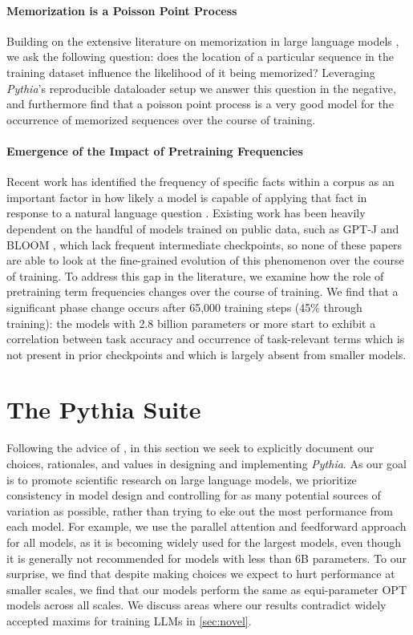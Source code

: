 \paragraph{Memorization is a Poisson Point Process} Building on the extensive literature on memorization in large language models \citep{carlini2019secret,carlini2021extracting,hu2022membership}, we ask the following question: does the location of a particular sequence in the training dataset influence the likelihood of it being memorized? Leveraging \textit{Pythia}'s reproducible dataloader setup we answer this question in the negative, and furthermore find that a poisson point process is a very good model for the occurrence of memorized sequences over the course of training.

\paragraph{Emergence of the Impact of Pretraining Frequencies} Recent work has identified the frequency of specific facts within a corpus as an important factor in how likely a model is capable of applying that fact in response to a natural language question \citep{razeghi2022impact,elazar2022measuring,kandpal2022large,mallen2022parametric}. Existing work has been heavily dependent on the handful of models trained on public data, such as GPT-J \citep{gpt-j} and BLOOM \citep{scao2022bloom}, which lack frequent intermediate checkpoints, so none of these papers are able to look at the fine-grained evolution of this phenomenon over the course of training. To address this gap in the literature, we examine how the role of pretraining term frequencies changes over the course of training. We find that a significant phase change occurs after 65,000 training steps (45\% through training): the models with 2.8 billion parameters or more start to exhibit a correlation between task accuracy and occurrence of task-relevant terms which is not present in prior checkpoints and which is largely absent from smaller models.

\section{The Pythia Suite}\label{sec:pythia}

Following the advice of \citet{birhane2021values}, in this section we seek to explicitly document our choices, rationales, and values in designing and implementing \textit{Pythia}. As our goal is to promote scientific research on large language models, we prioritize consistency in model design and controlling for as many potential sources of variation as possible, rather than trying to eke out the most performance from each model. For example, we use the parallel attention and feedforward approach for all models, as it is becoming widely used for the largest models, even though it is generally not recommended for models with less than 6B parameters. To our surprise, we find that despite making choices we expect to hurt performance at smaller scales, we find that our models perform the same as equi-parameter OPT models across all scales. We discuss areas where our results contradict widely accepted maxims for training LLMs in \ref{sec:novel}.


